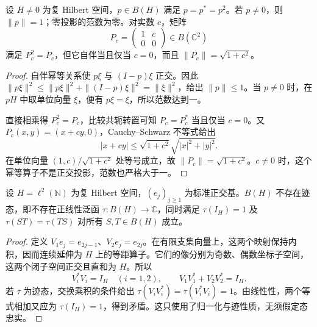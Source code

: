 \begin{proposition}\label{b2:prop:D-projection-idempotent}
	设 \(H\ne0\) 为复 Hilbert 空间，\(p\in B(H)\) 满足 \(p=p^*=p^2\)。若 \(p\ne0\)，则 \(\|p\|=1\)；零投影的范数为零。对实数 \(c\)，矩阵
	\[
		P_c=\begin{pmatrix}1&c\\0&0\end{pmatrix}\in B(\mathbb C^2)
	\]
	满足 \(P_c^2=P_c\)，但它自伴当且仅当 \(c=0\)，而且 \(\|P_c\|=\sqrt{1+c^2}\)。
\end{proposition}
\begin{proof}
	自伴幂等关系使 \(p\xi\) 与 \((I-p)\xi\) 正交。因此 \(\|p\xi\|^2\le\|p\xi\|^2+\|(I-p)\xi\|^2=\|\xi\|^2\)，给出 \(\|p\|\le1\)。当 \(p\ne0\) 时，在 \(pH\) 中取单位向量 \(\xi\)，便有 \(p\xi=\xi\)，所以范数达到一。

	直接相乘得 \(P_c^2=P_c\)，比较共轭转置可知 \(P_c=P_c^*\) 当且仅当 \(c=0\)。又 \(P_c(x,y)=(x+cy,0)\)，Cauchy--Schwarz 不等式给出
	\[
		|x+cy|\le\sqrt{1+c^2}\sqrt{|x|^2+|y|^2}.
	\]
	在单位向量 \((1,c)/\sqrt{1+c^2}\) 处等号成立，故 \(\|P_c\|=\sqrt{1+c^2}\)。\(c\ne0\) 时，这个幂等算子不是正交投影，范数也严格大于一。
\end{proof}

\begin{proposition}\label{b2:prop:D-no-tracial-state}
	设 \(H=\ell^2(\mathbb N)\) 为复 Hilbert 空间，\((e_j)_{j\ge1}\) 为标准正交基。\(B(H)\) 不存在迹态，即不存在正线性泛函 \(\tau:B(H)\to\mathbb C\)，同时满足 \(\tau(I_H)=1\) 及 \(\tau(ST)=\tau(TS)\) 对所有 \(S,T\in B(H)\) 成立。
\end{proposition}
\begin{proof}
	定义 \(V_1e_j=e_{2j-1}\)、\(V_2e_j=e_{2j}\)。在有限支集向量上，这两个映射保持内积，因而连续延伸为 \(H\) 上的等距算子。它们的像分别为奇数、偶数坐标子空间，这两个闭子空间正交且直和为 \(H\)。所以
	\[
		V_i^*V_i=I_H\quad(i=1,2),\qquad V_1V_1^*+V_2V_2^*=I_H.
	\]
	若 \(\tau\) 为迹态，交换乘积的条件给出 \(\tau(V_iV_i^*)=\tau(V_i^*V_i)=1\)。由线性性，两个等式相加又应为 \(\tau(I_H)=1\)，得到矛盾。这只使用了归一化与迹性质，无须假定态忠实。
\end{proof}

